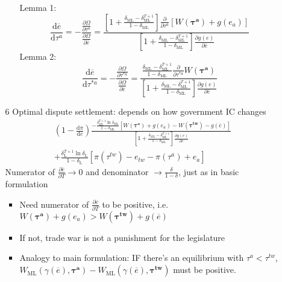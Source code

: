 \documentclass[12pt]{article}
\newcommand{\ov}{\overline}
\newcommand{\bta}{\bm{\tau^a}}
\newcommand{\btw}{\bm{\tau^{tw}}}
\newcommand{\ga}{\gamma}
\newcommand{\de}{\delta}
\begin{document}
\begin{itemize}
\begin{itemize}
\begin{itemize}
\begin{itemize}
								\end{itemize}
							Lemma 1:
							\begin{equation}
								\frac{\mathrm{d} \ov{e}}{\mathrm{d} \tau^a} = -\frac{\frac{\partial \Omega}{\partial \tau^a}}{\frac{\partial \Omega}{\partial \ov{e}}} =
	\textstyle \frac{\left[1+ \frac{\de_\text{ML} - \de_\text{ML}^{T+1}}{1-\de_\text{ML}}  \right]\frac{\partial}{\partial \tau^a}\left[W(\bta) + g(e_a)\right]}{\left[1+\frac{\de_\text{ML} - \de_\text{ML}^{T+1}}{1-\de_\text{ML}}\right] \frac{\partial g(e)}{\partial \ov{e}} }
							\end{equation}
							Lemma 2:
							\begin{equation*}
								\frac{\mathrm{d} \ov{e}}{\mathrm{d} \tau^{*a}} = -\frac{\frac{\partial \Omega}{\partial \tau^{*a}}}{\frac{\partial \Omega}{\partial \ov{e}}} =
	\textstyle \frac{\frac{\de_\text{ML} - \de_\text{ML}^{T+1}}{1-\de_\text{ML}}  \frac{\partial}{\partial \tau^{*a}}W(\bta)}{\left[1+\frac{\de_\text{ML} - \de_\text{ML}^{T+1}}{1-\de_\text{ML}}\right] \frac{\partial g(e)}{\partial \ov{e}} }
							\end{equation*}
				\end{itemize}
			\item[6] Optimal dispute settlement: depends on how government IC changes
			  \begin{multline}
					\left(1 - \frac{\mathrm{d} \pi}{\mathrm{d} \ov{e}} \right) \frac{ -\frac{\de_\text{ML}^{T+1}\ln\de_\text{ML}}{1-\de_\text{ML}}\left[  W(\bta) +g(e_a) - W(\btw) - g(\ov{e}) \right]}{\left[ 1 + \frac{\de_\text{ML} - \de_\text{ML}^{T+1}}{1-\de_\text{ML}} \right] \frac{\partial g(e)}{\partial e} } \\
	+  \frac{\de_\text{L}^{T+1} \ln \de_\text{L}}{1-\de_\text{L}} \left[ \pi(\tau^{tw}) - e_{tw} -\pi(\tau^a) + e_a \right]
				\end{multline}
				Numerator of $\frac{\partial \ov{e}}{\partial T} \rightarrow 0$ and denominator $\rightarrow \frac{\de}{1-\de}$, just as in basic formulation
				\begin{itemize}
					\item Need numerator of $\frac{\partial \ov{e}}{\partial T}$ to be positive, i.e. $W(\bta) +g(e_a) > W(\btw) + g(\ov{e})$
					\item If not, trade war is not a punishment for the legislature
					\item Analogy to main formulation: IF there's an equilibrium with $\tau^a < \tau^{tw}$, $W_\text{ML}(\ga(\ov{e}),\bta) - W_\text{ML}(\ga(\ov{e}),\btw)$ must be positive.

\end{itemize}
\end{itemize}
\end{itemize}
\end{document}
